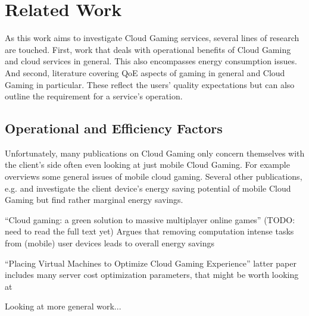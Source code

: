 \section{Related Work}
\label{sec:relatedwork}

As this work aims to investigate Cloud Gaming services, several lines of research are touched. 
First, work that deals with operational benefits of Cloud Gaming and cloud services in general. This also encompasses energy consumption issues.
And second, literature covering \gls{QoE} aspects of gaming in general and Cloud Gaming in particular. These reflect the users' quality expectations but can also outline the requirement for a service's operation.




\subsection{Operational and Efficiency Factors}

Unfortunately, many publications on Cloud Gaming only concern themselves with the client's side often even looking at just mobile Cloud Gaming. For example \cite{Soliman2013} overviews some general issues of mobile cloud gaming. Several other publications, e.g. \cite{6924295} and \cite{Huang:2014:MCP:2755535.2755542} investigate the client device's energy saving potential of mobile Cloud Gaming but find rather marginal energy savings.


``Cloud gaming: a green solution to massive multiplayer online games'' \cite{6882299}
(TODO: need to read the full text yet)
Argues that removing computation intense tasks from (mobile) user devices leads to overall energy savings

``Placing Virtual Machines to Optimize Cloud Gaming Experience'' \cite{6853364}
latter paper includes many server cost optimization parameters, that might be worth looking at

Looking at more general work...


